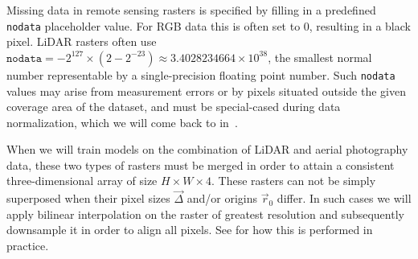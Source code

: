 Missing data in remote sensing rasters is specified by filling in a predefined \texttt{nodata} placeholder value.
For RGB data this is often set to $0$, resulting in a black pixel.
LiDAR rasters often use $\texttt{nodata} = -2^{127} \times (2 - 2^{-23}) \approx 3.4028234664 \times 10^{38}$, the smallest normal number representable by a single-precision floating point number.
Such \texttt{nodata} values may arise from measurement errors or by pixels situated outside the given coverage area of the dataset, and must be special-cased during data normalization, which we will come back to in~.

When we will train models on the combination of LiDAR and aerial photography data, these two types of rasters must be merged in order to attain a consistent three-dimensional array of size $H \times W \times 4$.
These rasters can not be simply superposed when their pixel sizes $\vec{\Delta}$ and/or origins $\vec{r}_0$ differ.
In such cases we will apply bilinear interpolation on the raster of greatest resolution and subsequently downsample it in order to align all pixels.
See  for how this is performed in practice.
